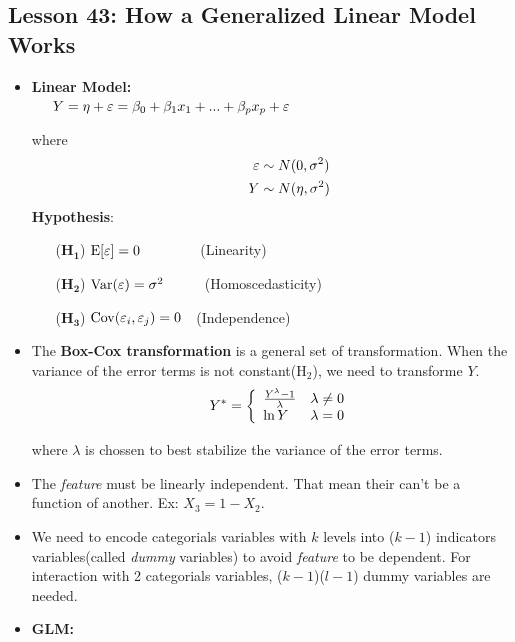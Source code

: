 \documentclass[10pt, french]{article}
\begin{document}
\begin{multicols*}{3}
\section*{Lesson 43: How a Generalized Linear Model Works}
\begin{itemize}[align=left,leftmargin=*]
  \item \textbf{Linear Model:} \\
  $\hspace*{0.5cm} Y = \eta + \varepsilon =  \beta_0 + \beta_1 x_1 + ... + \beta_p x_p + \varepsilon $
  \item[] where
  \begin{align*}
    \hspace*{1cm}
    \varepsilon &\sim N(0, \sigma^2) \\
    Y &\sim N(\eta, \sigma^2)
  \end{align*}
  \textbf{Hypothesis}:
  \begin{itemize}
    \item[($\mathbf{H_1}$)] $\mathrm{E} {\left[ \varepsilon \right]} = 0\quad\quad\quad\quad\:$(Linearity)
    \item[($\mathbf{H_2}$)] $\mathrm{Var} {\left( \varepsilon \right)} = \sigma^2\quad\quad\:\:\:\:$(Homoscedasticity)
    \item[($\mathbf{H_3}$)] $\mathrm{Cov} {\left( \varepsilon_i, \varepsilon_j \right)} = 0\quad$(Independence)
  \end{itemize}
  \item The \textbf{Box-Cox transformation} is a general set of transformation. When the variance of the error terms is not constant($\mathrm{H_2}$), we need to transforme $Y$.
  \[ \hspace*{0.5cm}
  Y^{*} = \left\{
  \begin{array}{lr}
    \frac{Y^\lambda - 1}{\lambda} & \lambda \neq 0 \\
    \ln Y & \lambda = 0
  \end{array}
  \right.
  \]
  \item[] where $\lambda$ is chossen to best stabilize the variance of the error terms.
  \item The \emph{feature} must be linearly independent. That mean their can't be a function of another. Ex: $X_3 = 1 - X_2$.
  \item We need to encode categorials variables with $k$ levels into ($k-1$) indicators variables(called \emph{dummy} variables) to avoid \emph{feature} to be dependent. For interaction with 2 categorials variables, ($k-1$)($l-1$) dummy variables are needed.
  \item \textbf{GLM:} \\

\end{itemize}
\end{multicols*}
\end{document}
